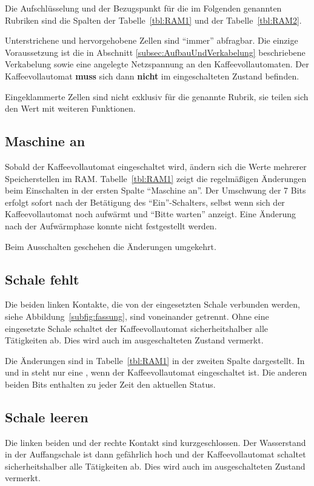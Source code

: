 Die Aufschlüsselung und der Bezugspunkt für die im Folgenden genannten Rubriken sind die Spalten der Tabelle~\ref{tbl:RAM1} und der Tabelle~\ref{tbl:RAM2}.

Unterstrichene und hervorgehobene Zellen sind "`immer"' abfragbar.
Die einzige Voraussetzung ist die in Abschnitt \ref{subsec:AufbauUndVerkabelung} beschriebene Verkabelung sowie eine angelegte Netzspannung an den Kaffeevollautomaten.
Der Kaffeevollautomat \textbf{muss} sich dann \textbf{nicht} im eingeschalteten Zustand befinden.

Eingeklammerte Zellen sind nicht exklusiv für die genannte Rubrik, sie teilen sich den Wert mit weiteren Funktionen.

\subsection{Maschine an}
Sobald der Kaffeevollautomat eingeschaltet wird, ändern sich die Werte mehrerer Speicherstellen im \ac{RAM}.
Tabelle~\ref{tbl:RAM1} zeigt die regelmäßigen Änderungen beim Einschalten in der ersten Spalte "`Maschine an"'.
Der Umschwung der 7 Bits erfolgt sofort nach der Betätigung des "`Ein"'-Schalters, selbst wenn sich der Kaffeevollautomat noch aufwärmt und "`Bitte warten"' anzeigt.
Eine Änderung nach der Aufwärmphase konnte nicht festgestellt werden.

Beim Ausschalten geschehen die Änderungen umgekehrt.

\subsection{Schale fehlt}
Die beiden linken Kontakte, die von der eingesetzten Schale verbunden werden, siehe Abbildung~\ref{subfig:fassung}, sind voneinander getrennt.
Ohne eine eingesetzte Schale schaltet der Kaffeevollautomat sicherheitshalber alle Tätigkeiten ab.
Dies wird auch im ausgeschalteten Zustand vermerkt.

Die Änderungen sind in Tabelle~\ref{tbl:RAM1} in der zweiten Spalte dargestellt.
In  und in  steht nur eine , wenn der Kaffeevollautomat eingeschaltet ist.
Die anderen beiden Bits enthalten zu jeder Zeit den aktuellen Status.

\subsection{Schale leeren}
Die linken beiden und der rechte Kontakt sind kurzgeschlossen.
Der Wasserstand in der Auffangschale ist dann gefährlich hoch und der Kaffeevollautomat schaltet sicherheitshalber alle Tätigkeiten ab.
Dies wird auch im ausgeschalteten Zustand vermerkt.

